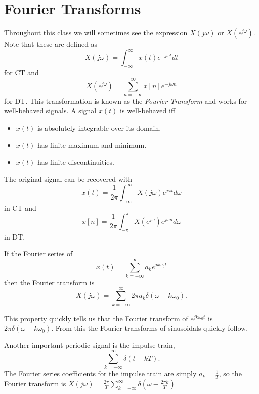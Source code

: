 \section{Fourier Transforms} \label{sec:fouriertransforms}

Throughout this class we will sometimes see the expression $X(j\omega)$
or $X(e^{j\omega})$.
Note that these are defined as
\begin{equation}
    X(j\omega) = \int_{-\infty}^{\infty} x(t) e^{-j\omega t} dt
\end{equation}
for CT and
\begin{equation}
    X(e^{j\omega}) = \sum_{n=-\infty}^{\infty} x[n] e^{-j\omega n}
\end{equation}
for DT. This transformation is known as the \emph{Fourier Transform}
and works for well-behaved signals.
A signal $x(t)$ is well-behaved iff
\begin{itemize}
    \item $x(t)$ is absolutely integrable over its domain.
    \item $x(t)$ has finite maximum and minimum.
    \item $x(t)$ has finite discontinuities.
\end{itemize}
The original signal can be recovered with
\begin{equation}
    x(t) = \frac{1}{2\pi} \int_{-\infty}^{\infty} X(j\omega) e^{j\omega t} d\omega
\end{equation}
in CT and
\begin{equation}
    x[n] = \frac{1}{2\pi} \int_{-\pi}^{\pi} X(e^{j\omega}) e^{j\omega n} d\omega
\end{equation}
in DT.

If the Fourier series of
\begin{equation}
    x(t) = \sum_{k=-\infty}^{\infty} a_k e^{jk\omega_0 t}
\end{equation}
then the Fourier transform is
\begin{equation}
    X(j\omega) = \sum_{k=-\infty}^{\infty} 2\pi a_k \delta(\omega - k\omega_0).
\end{equation}

This property quickly tells us that the Fourier transform
of $e^{jk\omega_0 t}$ is $2\pi \delta(\omega-k\omega_0)$.
From this the Fourier transforms of sinusoidals quickly follow.

Another important periodic signal is the impulse train,
\begin{equation}
    \sum_{k=-\infty}^{\infty} \delta(t - kT).
\end{equation}
The Fourier series coefficients for
the impulse train are simply $a_k = \frac{1}{T}$,
so the Fourier transform is
$X(j\omega) = \frac{2\pi}{T} \sum_{k=-\infty}^{\infty} \delta(\omega - \frac{2\pi k}{T})$


